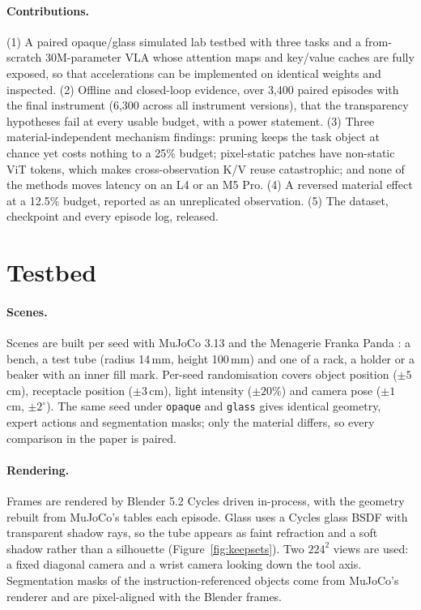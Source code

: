 \documentclass[11pt]{article}
\begin{document}
\paragraph{Contributions.} (1) A paired opaque/glass simulated lab testbed with three tasks and a from-scratch 30M-parameter VLA whose attention maps and key/value caches are fully exposed, so that accelerations can be implemented on identical weights and inspected. (2) Offline and closed-loop evidence, over 3,400 paired episodes with the final instrument (6,300 across all instrument versions), that the transparency hypotheses fail at every usable budget, with a power statement. (3) Three material-independent mechanism findings: pruning keeps the task object at chance yet costs nothing to a 25\% budget; pixel-static patches have non-static ViT tokens, which makes cross-observation K/V reuse catastrophic; and none of the methods moves latency on an L4 or an M5 Pro. (4) A reversed material effect at a 12.5\% budget, reported as an unreplicated observation. (5) The dataset, checkpoint and every episode log, released.

\section{Testbed}
\label{sec:testbed}

\paragraph{Scenes.} Scenes are built per seed with MuJoCo 3.13 \citep{todorov2012mujoco} and the Menagerie Franka Panda \citep{menagerie2022}: a bench, a test tube (radius 14\,mm, height 100\,mm) and one of a rack, a holder or a beaker with an inner fill mark. Per-seed randomisation covers object position ($\pm 5$\,cm), receptacle position ($\pm 3$\,cm), light intensity ($\pm 20\%$) and camera pose ($\pm 1$\,cm, $\pm 2^\circ$). The same seed under \texttt{opaque} and \texttt{glass} gives identical geometry, expert actions and segmentation masks; only the material differs, so every comparison in the paper is paired.

\paragraph{Rendering.} Frames are rendered by Blender 5.2 Cycles \citep{blender2026} driven in-process, with the geometry rebuilt from MuJoCo's tables each episode. Glass uses a Cycles glass BSDF with transparent shadow rays, so the tube appears as faint refraction and a soft shadow rather than a silhouette (Figure~\ref{fig:keepsets}). Two $224^2$ views are used: a fixed diagonal camera and a wrist camera looking down the tool axis. Segmentation masks of the instruction-referenced objects come from MuJoCo's renderer and are pixel-aligned with the Blender frames.
\end{document}
